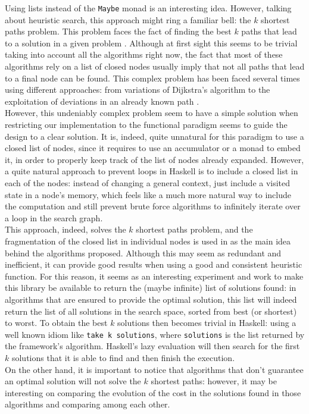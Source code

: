 Using lists instead of the \texttt{Maybe} monad is an interesting idea.
However, talking about heuristic search, this approach might ring a familiar
bell: the $k$ shortest paths problem. This problem faces the fact of finding
the best $k$ paths that lead to a solution in a given problem
\cite{eppstein-1998-finding}. Although at first sight this seems to be trivial
taking into account all the algorithms right now, the fact that most of these
algorithms rely on a list of closed nodes usually imply that not all paths that
lead to a final node can be found. This complex problem has been faced several
times using different approaches: from variations of Dijkstra's algorithm to
the exploitation of deviations in an already known path
\cite{dreyfus-1969-appraisal}.\\

However, this undeniably complex problem seem to have a simple solution when
restricting our implementation to the functional paradigm seems to guide the
design to a clear solution. It is, indeed, quite unnatural for this paradigm to
use a closed list of nodes, since it requires to use an accumulator or a monad
to embed it, in order to properly keep track of the list of nodes already
expanded. However, a quite natural approach to prevent loops in Haskell is to
include a closed list in each of the nodes: instead of changing a general
context, just include a visited state in a node's memory, which feels like a
much more natural way to include the computation and still prevent brute force
algorithms to infinitely iterate over a loop in the search graph.\\

This approach, indeed, solves the $k$ shortest paths problem, and the
fragmentation of the closed list in individual nodes is used in
\cite{dechter-2012-search} as the main idea behind the algorithms proposed.
Although this may seem as redundant and inefficient, it can provide good
results when using a good and consistent heuristic function. For this reason,
it seems as an interesting experiment and work to make this library be
available to return the (maybe infinite) list of solutions found: in algorithms
that are ensured to provide the optimal solution, this list will indeed return
the list of all solutions in the search space, sorted from best (or shortest)
to worst. To obtain the best $k$ solutions then becomes trivial in Haskell:
using a well known idiom like \texttt{take k solutions}, where
\texttt{solutions} is the list returned by the framework's algorithm. Haskell's
lazy evaluation will then search for the first $k$ solutions that it is able to
find and then finish the execution.\\

On the other hand, it is important to notice that algorithms that don't
guarantee an optimal solution will not solve the $k$ shortest paths: however,
it may be interesting on comparing the evolution of the cost in the solutions
found in those algorithms and comparing among each other.\\

\newpage
